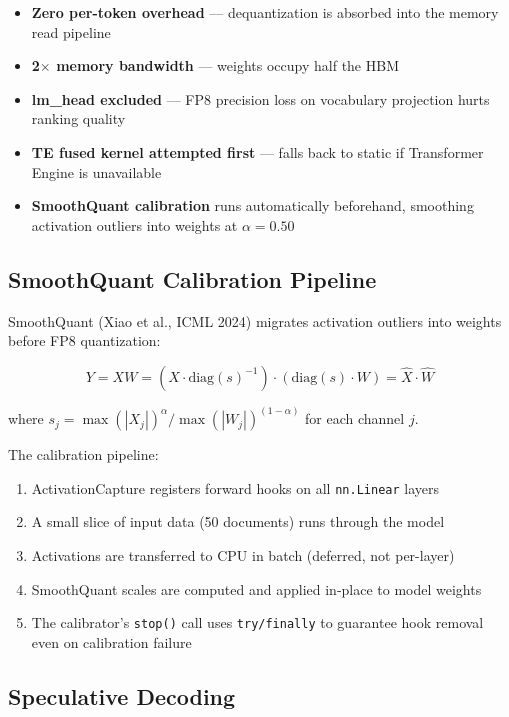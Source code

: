 \documentclass[11pt,a4paper,twoside]{article}
\begin{document}
\begin{itemize}[nosep]
  \item \textbf{Zero per-token overhead} --- dequantization is absorbed into the
    memory read pipeline
  \item \textbf{2$\times$ memory bandwidth} --- weights occupy half the HBM
  \item \textbf{lm\_head excluded} --- FP8 precision loss on vocabulary projection
    hurts ranking quality
  \item \textbf{TE fused kernel attempted first} --- falls back to static if
    Transformer Engine is unavailable
  \item \textbf{SmoothQuant calibration} runs automatically beforehand, smoothing
    activation outliers into weights at $\alpha = 0.50$
\end{itemize}

\subsection{SmoothQuant Calibration Pipeline}

SmoothQuant (Xiao et al., ICML 2024) migrates activation outliers into weights
before FP8 quantization:

\begin{equation}
  Y = XW = (X \cdot \text{diag}(s)^{-1}) \cdot (\text{diag}(s) \cdot W) = \hat{X} \cdot \hat{W}
\end{equation}

where $s_j = \max(|X_j|)^\alpha / \max(|W_j|)^{(1-\alpha)}$ for each channel $j$.

The calibration pipeline:
\begin{enumerate}[nosep]
  \item ActivationCapture registers forward hooks on all \texttt{nn.Linear} layers
  \item A small slice of input data (50 documents) runs through the model
  \item Activations are transferred to CPU in batch (deferred, not per-layer)
  \item SmoothQuant scales are computed and applied in-place to model weights
  \item The calibrator's \texttt{stop()} call uses \texttt{try/finally} to
    guarantee hook removal even on calibration failure
\end{enumerate}

\subsection{Speculative Decoding}
\end{document}

